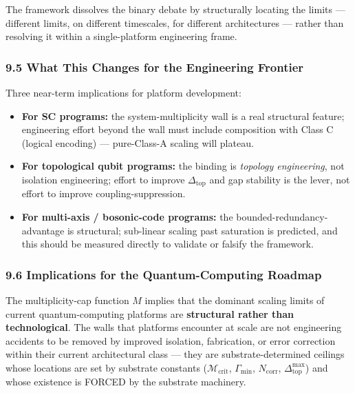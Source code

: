 \documentclass[
  11pt,
  a4paper,
]{article}
\providecommand{\tightlist}{%
  \setlength{\itemsep}{0pt}\setlength{\parskip}{0pt}}
\begin{document}
The framework dissolves the binary debate by structurally locating the
limits --- different limits, on different timescales, for different
architectures --- rather than resolving it within a single-platform
engineering frame.

\subsubsection{9.5 What This Changes for the Engineering
Frontier}\label{what-this-changes-for-the-engineering-frontier}

Three near-term implications for platform development:

\begin{itemize}
\tightlist
\item
  \textbf{For SC programs:} the system-multiplicity wall is a real
  structural feature; engineering effort beyond the wall must include
  composition with Class C (logical encoding) --- pure-Class-A scaling
  will plateau.
\item
  \textbf{For topological qubit programs:} the binding is \emph{topology
  engineering}, not isolation engineering; effort to improve
  \(\Delta_{\mathrm{top}}\) and gap stability is the lever, not effort
  to improve coupling-suppression.
\item
  \textbf{For multi-axis / bosonic-code programs:} the
  bounded-redundancy-advantage is structural; sub-linear scaling past
  saturation is predicted, and this should be measured directly to
  validate or falsify the framework.
\end{itemize}

\subsubsection{9.6 Implications for the Quantum-Computing
Roadmap}\label{implications-for-the-quantum-computing-roadmap}

The multiplicity-cap function \(M\) implies that the dominant scaling
limits of current quantum-computing platforms are \textbf{structural
rather than technological}. The walls that platforms encounter at scale
are not engineering accidents to be removed by improved isolation,
fabrication, or error correction within their current architectural
class --- they are substrate-determined ceilings whose locations are set
by substrate constants (\(\mathcal{M}_{\mathrm{crit}}\),
\(\Gamma_{\mathrm{min}}\), \(N_{\mathrm{corr}}\),
\(\Delta_{\mathrm{top}}^{\max}\)) and whose existence is FORCED by the
substrate machinery.
\end{document}

